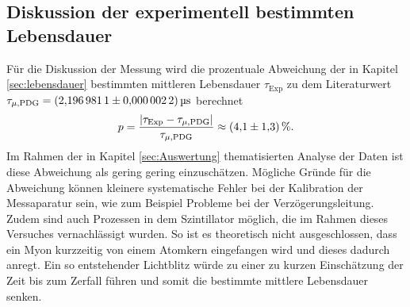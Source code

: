 \subsection*{Diskussion der experimentell bestimmten Lebensdauer}
Für die Diskussion der Messung wird die prozentuale Abweichung der in Kapitel \ref{sec:lebensdauer} bestimmten mittleren Lebensdauer $\tau_\text{Exp}$ 
zu dem Literaturwert $\tau_{\mu,\text{PDG}}=\SI{2.1969811 \pm0.0000022}{\micro\second}$ \cite{PDG} berechnet
\begin{equation*}
    p=\frac{|\tau_\text{Exp}-\tau_{\mu,\text{PDG}}|}{\tau_{\mu,\text{PDG}}}\approx \SI{4.1\pm1.3}{\percent}.
\end{equation*}
Im Rahmen der in Kapitel \ref{sec:Auswertung} thematisierten Analyse der Daten ist diese Abweichung als gering gering einzuschätzen. Mögliche Gründe für die Abweichung 
können kleinere systematische Fehler bei der Kalibration der Messaparatur sein, wie zum Beispiel Probleme bei der Verzögerungsleitung. Zudem sind auch Prozessen in dem
Szintillator möglich, die im Rahmen dieses Versuches vernachlässigt wurden. So ist es theoretisch nicht ausgeschlossen, dass ein Myon kurzzeitig von einem Atomkern 
eingefangen wird und dieses dadurch anregt. Ein so entstehender Lichtblitz würde zu einer zu kurzen Einschätzung der Zeit bis zum Zerfall führen und somit die 
bestimmte mittlere Lebensdauer senken.